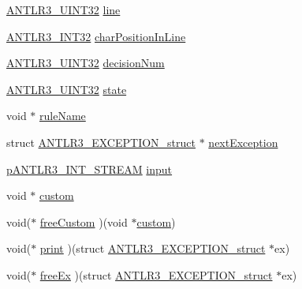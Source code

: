 \begin{DoxyCompactItemize}
\item 
\hyperlink{antlr3defs_8h_ac41f744abd0fd25144b9eb9d11b1dfd1}{A\-N\-T\-L\-R3\-\_\-\-U\-I\-N\-T32} \hyperlink{struct_a_n_t_l_r3___e_x_c_e_p_t_i_o_n__struct_ab99cca3f3aeb20df8ceadbd971f4a236}{line}
\item 
\hyperlink{antlr3defs_8h_a6faef5c4687f8eb633d2aefea93973ca}{A\-N\-T\-L\-R3\-\_\-\-I\-N\-T32} \hyperlink{struct_a_n_t_l_r3___e_x_c_e_p_t_i_o_n__struct_ad72064f7ff1584daf70684b1352ac2c3}{char\-Position\-In\-Line}
\item 
\hyperlink{antlr3defs_8h_ac41f744abd0fd25144b9eb9d11b1dfd1}{A\-N\-T\-L\-R3\-\_\-\-U\-I\-N\-T32} \hyperlink{struct_a_n_t_l_r3___e_x_c_e_p_t_i_o_n__struct_ada63a81c5e1e92235b553efc064d8998}{decision\-Num}
\item 
\hyperlink{antlr3defs_8h_ac41f744abd0fd25144b9eb9d11b1dfd1}{A\-N\-T\-L\-R3\-\_\-\-U\-I\-N\-T32} \hyperlink{struct_a_n_t_l_r3___e_x_c_e_p_t_i_o_n__struct_a6161406e61e64bccc6d97bd0230231d7}{state}
\item 
void $\ast$ \hyperlink{struct_a_n_t_l_r3___e_x_c_e_p_t_i_o_n__struct_ae3d3014a069b29bef5d45f3861921c21}{rule\-Name}
\item 
struct \hyperlink{struct_a_n_t_l_r3___e_x_c_e_p_t_i_o_n__struct}{A\-N\-T\-L\-R3\-\_\-\-E\-X\-C\-E\-P\-T\-I\-O\-N\-\_\-struct} $\ast$ \hyperlink{struct_a_n_t_l_r3___e_x_c_e_p_t_i_o_n__struct_aa10dbef2cfd1b56448e18587e48bbccb}{next\-Exception}
\item 
\hyperlink{antlr3interfaces_8h_af34d949f6aa442e8e7770e420977d338}{p\-A\-N\-T\-L\-R3\-\_\-\-I\-N\-T\-\_\-\-S\-T\-R\-E\-A\-M} \hyperlink{struct_a_n_t_l_r3___e_x_c_e_p_t_i_o_n__struct_a8fb8620d51e1af5614f679dd5e5374bb}{input}
\item 
void $\ast$ \hyperlink{struct_a_n_t_l_r3___e_x_c_e_p_t_i_o_n__struct_aa85c315545a87eea1688b5301ca03b19}{custom}
\item 
void($\ast$ \hyperlink{struct_a_n_t_l_r3___e_x_c_e_p_t_i_o_n__struct_a94a8cffe5a17abac24efc432732ccfc4}{free\-Custom} )(void $\ast$\hyperlink{struct_a_n_t_l_r3___e_x_c_e_p_t_i_o_n__struct_aa85c315545a87eea1688b5301ca03b19}{custom})
\item 
void($\ast$ \hyperlink{struct_a_n_t_l_r3___e_x_c_e_p_t_i_o_n__struct_a1b5513423bdabac1b5bfd00aa74b7cd0}{print} )(struct \hyperlink{struct_a_n_t_l_r3___e_x_c_e_p_t_i_o_n__struct}{A\-N\-T\-L\-R3\-\_\-\-E\-X\-C\-E\-P\-T\-I\-O\-N\-\_\-struct} $\ast$ex)
\item 
void($\ast$ \hyperlink{struct_a_n_t_l_r3___e_x_c_e_p_t_i_o_n__struct_a75c2b86b3a43c5973f82e7e0a19ac4b4}{free\-Ex} )(struct \hyperlink{struct_a_n_t_l_r3___e_x_c_e_p_t_i_o_n__struct}{A\-N\-T\-L\-R3\-\_\-\-E\-X\-C\-E\-P\-T\-I\-O\-N\-\_\-struct} $\ast$ex)
\end{DoxyCompactItemize}


